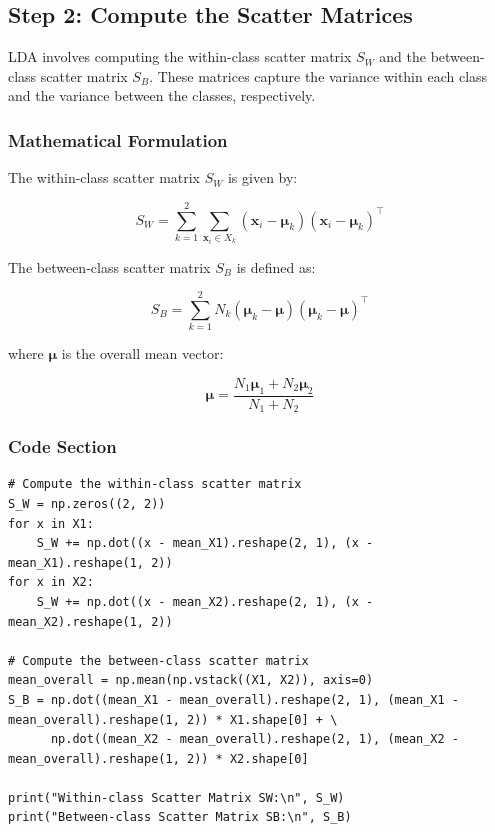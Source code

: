 \documentclass{exam}
\begin{document}
\newpage

\subsection{Step 2: Compute the Scatter Matrices}

LDA involves computing the within-class scatter matrix \( S_W \) and the between-class scatter matrix \( S_B \). These matrices capture the variance within each class and the variance between the classes, respectively.

\subsubsection*{Mathematical Formulation}

The within-class scatter matrix \( S_W \) is given by:

\[
S_W = \sum_{k=1}^{2} \sum_{\mathbf{x}_i \in X_k} (\mathbf{x}_i - \mathbf{\mu}_k)(\mathbf{x}_i - \mathbf{\mu}_k)^\top
\]

The between-class scatter matrix \( S_B \) is defined as:

\[
S_B = \sum_{k=1}^{2} N_k (\mathbf{\mu}_k - \mathbf{\mu})(\mathbf{\mu}_k - \mathbf{\mu})^\top
\]

where \( \mathbf{\mu} \) is the overall mean vector:

\[
\mathbf{\mu} = \frac{N_1 \mathbf{\mu}_1 + N_2 \mathbf{\mu}_2}{N_1 + N_2}
\]

\subsubsection*{Code Section}

\begin{verbatim}
# Compute the within-class scatter matrix
S_W = np.zeros((2, 2))
for x in X1:
    S_W += np.dot((x - mean_X1).reshape(2, 1), (x - mean_X1).reshape(1, 2))
for x in X2:
    S_W += np.dot((x - mean_X2).reshape(2, 1), (x - mean_X2).reshape(1, 2))

# Compute the between-class scatter matrix
mean_overall = np.mean(np.vstack((X1, X2)), axis=0)
S_B = np.dot((mean_X1 - mean_overall).reshape(2, 1), (mean_X1 - mean_overall).reshape(1, 2)) * X1.shape[0] + \
      np.dot((mean_X2 - mean_overall).reshape(2, 1), (mean_X2 - mean_overall).reshape(1, 2)) * X2.shape[0]

print("Within-class Scatter Matrix SW:\n", S_W)
print("Between-class Scatter Matrix SB:\n", S_B)
\end{verbatim}
\end{document}
